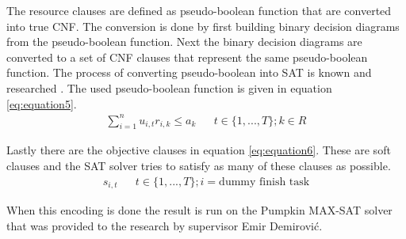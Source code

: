 The resource clauses are defined as pseudo-boolean function that are converted into true CNF. The conversion is done by first building binary decision diagrams from the pseudo-boolean function. Next the binary decision diagrams are converted to a set of CNF clauses that represent the same pseudo-boolean function. The process of converting pseudo-boolean into SAT is known and researched \cite{RN38}. The used pseudo-boolean function is given in equation \ref{eq:equation5}.
\begin{align}\label{eq:equation5}
\sum^n_{i=1} u_{i,t}r_{i,k} \leq a_k    &&  t\in \{1,...,T\}; k\in R
\end{align}

Lastly there are the objective clauses in equation \ref{eq:equation6}. These are soft clauses and the SAT solver tries to satisfy as many of these clauses as possible.
\begin{align}\label{eq:equation6}
s_{i,t} &&  t\in \{1,...,T\}; i = \text{dummy finish task}
\end{align}

When this encoding is done the result is run on the Pumpkin MAX-SAT solver that was provided to the research by supervisor Emir Demirović.

